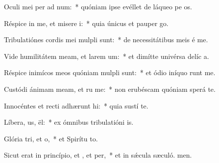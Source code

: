 \item Oculi mei per ad num:~* quóniam ipse evéllet de láqueo pe os.
\item Réspice in me, et misere i:~* quia únicus et pauper  go.
\item Tribulatiónes cordis mei mulpli sunt:~* de necessitátibus meis é me.
\item Vide humilitátem meam, et larem um:~* et dimítte univérsa delíc a.
\item Réspice inimícos meos quóniam mulpli sunt:~* et ódio iníquo runt me.
\item Custódi ánimam meam, et ru me:~* non erubéscam quóniam sperá  te.
\item Innocéntes et recti adhærunt hi:~* quia sustí te.
\item Líbera, us, ël:~* ex ómnibus tribulatióni is.
\item Glória tri, et o,~* et Spirítu to.
\item Sicut erat in princípio, et , et per,~* et in sǽcula sæculó. men.
